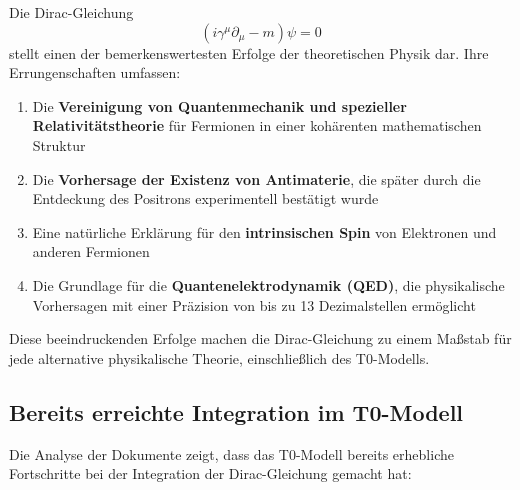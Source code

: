 \documentclass[12pt,a4paper]{article}
\begin{document}
	Die Dirac-Gleichung 
	\begin{equation}
		(i\gamma^\mu \partial_\mu - m)\psi = 0
	\end{equation}
	stellt einen der bemerkenswertesten Erfolge der theoretischen Physik dar. Ihre Errungenschaften umfassen:
	
	\begin{enumerate}
		\item Die \textbf{Vereinigung von Quantenmechanik und spezieller Relativitätstheorie} für Fermionen in einer kohärenten mathematischen Struktur
		
		\item Die \textbf{Vorhersage der Existenz von Antimaterie}, die später durch die Entdeckung des Positrons experimentell bestätigt wurde
		
		\item Eine natürliche Erklärung für den \textbf{intrinsischen Spin} von Elektronen und anderen Fermionen
		
		\item Die Grundlage für die \textbf{Quantenelektrodynamik (QED)}, die physikalische Vorhersagen mit einer Präzision von bis zu 13 Dezimalstellen ermöglicht
	\end{enumerate}
	
	Diese beeindruckenden Erfolge machen die Dirac-Gleichung zu einem Maßstab für jede alternative physikalische Theorie, einschließlich des T0-Modells.
	
	\subsection{Bereits erreichte Integration im T0-Modell}
	\label{subsec:dirac_integration}
	
	Die Analyse der Dokumente zeigt, dass das T0-Modell bereits erhebliche Fortschritte bei der Integration der Dirac-Gleichung gemacht hat:
	
\end{document}
